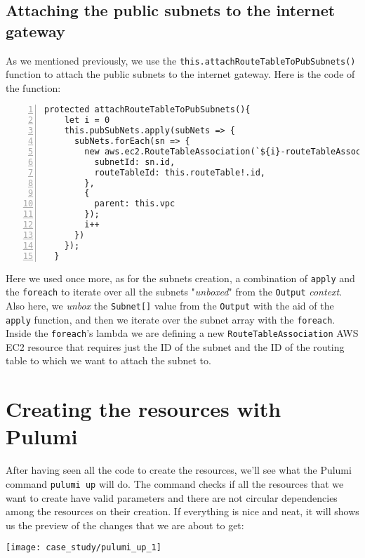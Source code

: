 \subsection{Attaching the public subnets to the internet gateway}
As we mentioned previously, we use the \texttt{this.attachRouteTableToPubSubnets()} function to attach the public subnets to the internet gateway.
Here is the code of the function:\\
\begin{minipage}{\linewidth}
\begin{lstlisting}[numbers=left, numberstyle=\tiny, numbersep=-5pt, stepnumber=1]
  protected attachRouteTableToPubSubnets(){
    let i = 0
    this.pubSubNets.apply(subNets => {
      subNets.forEach(sn => {
        new aws.ec2.RouteTableAssociation(`${i}-routeTableAssociation-typescript`, {
          subnetId: sn.id,
          routeTableId: this.routeTable!.id,
        },
        {
          parent: this.vpc
        });
        i++
      })
    });
  }
\end{lstlisting}
\end{minipage}
Here we used once more, as for the subnets creation, a combination of \texttt{apply} and the \texttt{foreach} to iterate over all the subnets "\textit{unboxed}" from the \texttt{Output} \textit{context}.
Also here, we \textit{unbox} the \texttt{Subnet[]} value from the \texttt{Output} with the aid of the \texttt{apply} function, and then we iterate over the subnet array with the \texttt{foreach}.\\
Inside the \texttt{foreach}'s lambda we are defining a new \texttt{RouteTableAssociation} AWS EC2 resource that requires just the ID of the subnet and the ID of the routing table to which we want to attach the subnet to.

\section{Creating the resources with Pulumi}
\label{sec:ts-res-creation}
After having seen all the code to create the resources, we'll see what the Pulumi command \texttt{pulumi up} will do.
The command checks if all the resources that we want to create have valid parameters and there are not circular dependencies among the resources on their creation.
If everything is nice and neat, it will shows us the preview of the changes that we are about to get:
\begin{center}
  \texttt{[image: case\_study/pulumi\_up\_1]} 
\end{center}\mbox{}\\

